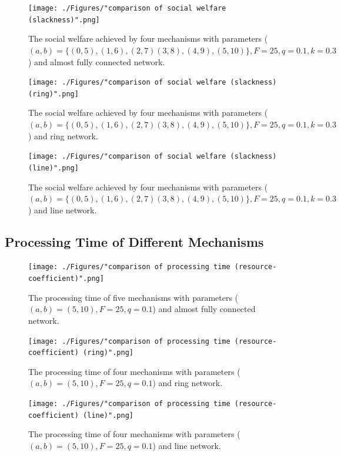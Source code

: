 \documentclass[11pt]{phdthesis}
\begin{document}
\begin{figure}[h]
    \centering
    \texttt{[image: ./Figures/"comparison of social welfare (slackness)".png]}
    \caption{The social welfare achieved by four mechanisms with parameters ($ (a, b) = \{ (0, 5), (1, 6), (2,7) (3, 8),(4, 9), (5, 10) \}, F=25, q=0.1, k=0.3 $) and almost fully connected network.}
    \label{fig: social_welfare_deadline_slackeness}
\end{figure}

\begin{figure}[h]
    \centering
    \texttt{[image: ./Figures/"comparison of social welfare (slackness) (ring)".png]}
    \caption{The social welfare achieved by four mechanisms with parameters ($ (a, b) = \{ (0, 5), (1, 6), (2,7) (3, 8),(4, 9), (5, 10) \}, F=25, q=0.1, k=0.3 $) and ring network.}
    \label{fig: social_welfare_deadline_slackeness_ring}
\end{figure}

\begin{figure}[h]
    \centering
    \texttt{[image: ./Figures/"comparison of social welfare (slackness) (line)".png]}
    \caption{The social welfare achieved by four mechanisms with parameters ($ (a, b) = \{ (0, 5), (1, 6), (2,7) (3, 8),(4, 9), (5, 10) \}, F=25, q=0.1, k=0.3 $) and line network.}
    \label{fig: social_welfare_deadline_slackeness_line}
\end{figure}

\subsection{Processing Time of Different Mechanisms}

\begin{figure}
    \centering
    \texttt{[image: ./Figures/"comparison of processing time (resource-coefficient)".png]}
    \caption{The processing time of five mechanisms with parameters ($ (a, b) = (5, 10), F = 25, q = 0.1 $) and almost fully connected network.}
    \label{fig: processing time}
\end{figure}

\begin{figure}
    \centering
    \texttt{[image: ./Figures/"comparison of processing time (resource-coefficient) (ring)".png]}
    \caption{The processing time of four mechanisms with parameters ($ (a, b) = (5, 10), F = 25, q = 0.1 $) and ring network.}
    \label{fig: processing time_ring}
\end{figure}

\begin{figure}
    \centering
    \texttt{[image: ./Figures/"comparison of processing time (resource-coefficient) (line)".png]}
    \caption{The processing time of four mechanisms with parameters ($ (a, b) = (5, 10), F = 25, q = 0.1 $) and line network.}
    \label{fig: processing time_line}
\end{figure}
\end{document}
